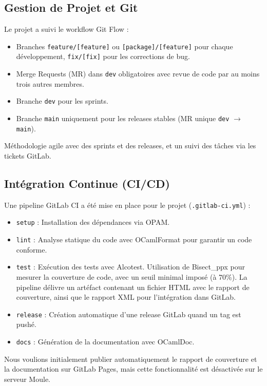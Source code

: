 \documentclass[12pt,a4paper]{article}
\begin{document}
\subsection{Gestion de Projet et Git}

Le projet a suivi le workflow Git Flow :
\begin{itemize}
    \item Branches \texttt{feature/[feature]} ou \texttt{[package]/[feature]} pour chaque développement, \texttt{fix/[fix]} pour les corrections de bug.
    \item Merge Requests (MR) dans \texttt{dev} obligatoires avec revue de code par au moins trois autres membres.
    \item Branche \texttt{dev} pour les sprints.
    \item Branche \texttt{main} uniquement pour les releases stables (MR unique \texttt{dev} $\to$ \texttt{main}).
\end{itemize}

Méthodologie agile avec des sprints et des releases, et un suivi des tâches via les tickets GitLab.

\subsection{Intégration Continue (CI/CD)}

Une pipeline GitLab CI a été mise en place pour le projet (\texttt{.gitlab-ci.yml}) :
\begin{itemize}
    \item \texttt{setup} : Installation des dépendances via OPAM.
    \item \texttt{lint} : Analyse statique du code avec OCamlFormat pour garantir un code conforme.
    \item \texttt{test} : Exécution des tests avec Alcotest. Utilisation de Bisect\_ppx pour mesurer la couverture de code, avec un seuil minimal imposé (à 70\%). La pipeline délivre un artéfact contenant un fichier HTML avec le rapport de couverture, ainsi que le rapport XML pour l'intégration dans GitLab.
    \item \texttt{release} : Création automatique d'une release GitLab quand un tag est pushé.
    \item \texttt{docs} : Génération de la documentation avec OCamlDoc.
\end{itemize}

Nous voulions initialement publier automatiquement le rapport de couverture et la documentation sur GitLab Pages, mais cette fonctionnalité est désactivée sur le serveur Moule.
\end{document}
